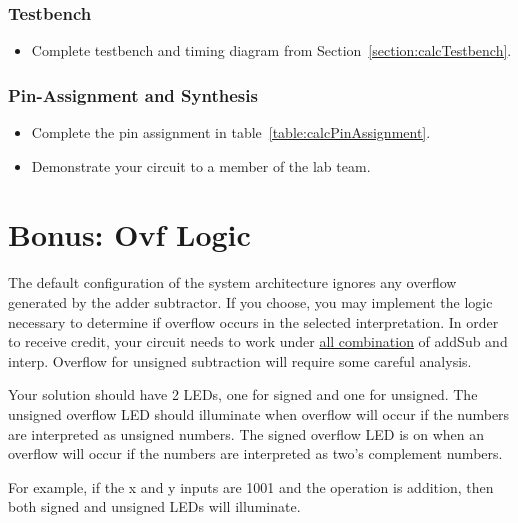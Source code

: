 \subsubsection{Testbench}
\begin{itemize}
\item Complete testbench and timing diagram from Section~\ref{section:calcTestbench}.
\end{itemize}

\subsubsection{Pin-Assignment and Synthesis}
\begin{itemize}
\item Complete the pin assignment in table~\ref{table:calcPinAssignment}.
\item Demonstrate your circuit to a member of the lab team.
\end{itemize}

\section{Bonus: Ovf Logic}

The default configuration of the system architecture ignores any
overflow generated by the adder subtractor. If you choose, you may
implement the logic necessary to determine if overflow occurs in the
selected interpretation. In order to receive credit, your circuit needs
to work under \uline{all combination} of addSub and interp. Overflow for
unsigned subtraction will require some careful analysis.

Your solution should have 2 LEDs, one for signed and one for unsigned.
The unsigned overflow LED should illuminate when overflow will occur if
the numbers are interpreted as unsigned numbers. The signed overflow LED
is on when an overflow will occur if the numbers are interpreted as
two's complement numbers.

For example, if the x and y inputs are 1001 and the operation is
addition, then both signed and unsigned LEDs will illuminate.